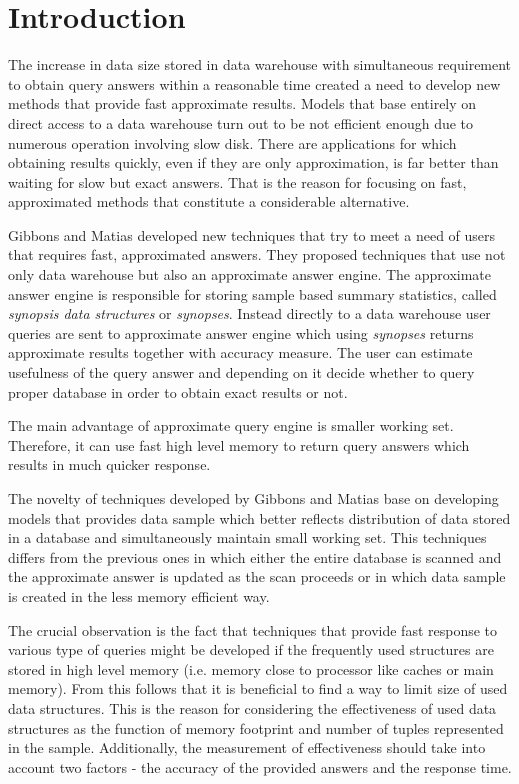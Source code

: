 \section{Introduction}
The increase in data size stored in data warehouse with simultaneous
requirement to obtain query answers within a reasonable time created a
need to develop new methods that provide fast approximate
results. Models that base entirely on direct access to a data
warehouse turn out to be not efficient enough due to numerous
operation involving slow disk. There are applications
for which obtaining results quickly, even if they are only
approximation, is far better than waiting for slow but exact
answers. That is the reason for focusing on fast, approximated methods that
constitute a considerable alternative.

Gibbons and Matias \cite{GM98} developed new techniques that try to meet a
need of users that requires fast, approximated answers. They proposed techniques that use not
only data warehouse but also an approximate answer engine.
The approximate answer engine is responsible for storing
sample based summary statistics, called \textit{synopsis data
  structures} or \textit{synopses}. Instead
directly to a data warehouse user queries are sent to approximate answer
engine which using \textit{synopses} returns approximate results
together with accuracy measure.
The user can estimate usefulness of the query answer and depending on it
decide whether to query proper database in order to obtain exact results or not.

The main advantage of approximate query engine is smaller working set.
Therefore, it can use fast high level memory to return query answers
which results in much quicker response.

The novelty of techniques developed by Gibbons and Matias
\cite{GM98} base on developing models that provides data sample
which better reflects distribution of
data stored in a database and simultaneously maintain small working set.
This techniques differs from the previous ones in which either the
entire database is scanned and the approximate answer is updated as
the scan proceeds or in which data sample is created in the less
memory efficient way.

The crucial observation is the fact that techniques that provide
fast response to various type of queries might be developed if the
frequently used structures are stored in high level memory
(i.e. memory close to processor like caches or main memory). From this follows
that it is beneficial to find a way to limit size of used data structures. This is
the reason for considering the effectiveness of used data structures
as the function of memory footprint and number of tuples represented
in the sample. Additionally, the measurement of effectiveness
should take into account two factors - the
accuracy of the provided answers and the response time.

